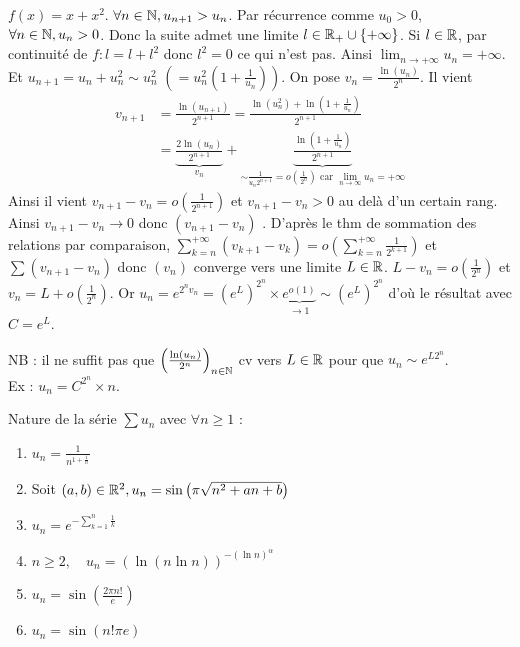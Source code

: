 \begin{solution}
$f(x) = x + x^2$. $\forall n \in \mathbb N, u_{n+1} > u_n$. Par récurrence comme $u_0 > 0$, $\forall n \in \mathbb N, u_n > 0$.
Donc la suite admet une limite $l \in \mathbb R_+ \cup \{+\infty\}$.
Si $l \in \mathbb R$, par continuité de $f : l = l + l^2$ donc $l^2 = 0$ ce qui n'est pas.
Ainsi $\lim_{n \to +\infty} u_n = +\infty$. Et $u_{n+1} = u_n + u_n^2 \sim u_n^2$ $\left( = u_n^2(1 + \frac{1}{u_n}) \right)$.
On pose $v_n = \frac{\ln(u_n)}{2^n}$.
Il vient
\begin{align*}
v_{n+1} &= \frac{\ln(u_{n+1})}{2^{n+1}} = \frac{\ln(u_n^2) + \ln(1+\frac{1}{u_n})}{2^{n+1}} \\
&= \underbrace{\frac{2\ln(u_n)}{2^{n+1}}}_{v_n} + \underbrace{\frac{\ln\left(1+\frac{1}{u_n}\right)}{2^{n+1}}}_{\sim \frac{1}{u_n 2^{n+1}} = o\left(\frac{1}{2^n}\right) \text{ car } \lim_{n \to \infty} u_n = +\infty}
\end{align*}
Ainsi il vient $v_{n+1} - v_n = o\left(\frac{1}{2^{n+1}}\right)$ et $v_{n+1} - v_n > 0$ au delà d'un certain rang. Ainsi $v_{n+1} - v_n \to 0$ donc $(v_{n+1} - v_n)$ .
D'après le thm de sommation des relations par comparaison, $\sum_{k=n}^{+\infty} (v_{k+1}-v_k) = o\left( \sum_{k=n}^{+\infty} \frac{1}{2^{k+1}} \right)$ et $\sum (v_{n+1}-v_n)$  donc $(v_n)$ converge vers une limite $L \in \mathbb R$.
$L - v_n = o\left(\frac{1}{2^n}\right)$ et $v_n = L + o\left(\frac{1}{2^n}\right)$.
Or $u_n = e^{2^n v_n} = (e^L)^{2^n} \times \underbrace{e^{o(1)}}_{\to 1} \sim (e^L)^{2^n}$ d'où le résultat avec $\boxed{C = e^L}$.

\begin{remarkbox}
NB : il ne suffit pas que $\left(\frac{\ln(u_n)}{2^n}\right)_{n \in \mathbb N}$ cv vers $L \in \mathbb R$ pour que $u_n \sim e^{L 2^n}$. \\
Ex : $u_n = C^{2^n} \times n$.
\end{remarkbox}
\end{solution}


\begin{statementbox}
Nature de la série $\sum u_n$ avec $\forall n \geq 1$ :
\begin{enumerate}[label=\alph*)]
  \item $u_n = \frac{1}{n^{1+\frac{1}{n}}}$
  \item Soit $(a,b) \in \mathbb R^2, u_n = \sin\left(\pi \sqrt{n^2+an+b}\right)$ 
  \setcounter{enumi}{3}
  \item $u_n = e^{- \sum_{k=1}^n \frac{1}{k}}$
  \setcounter{enumi}{5}
  \item $n \geq 2, \quad u_n = (\ln(n \ln n))^{-(\ln n)^\alpha}$
  \item $u_n = \sin\left(\frac{2\pi n!}{e}\right)$ \quad [Rappel : $\frac{1}{e} = \sum_{k=0}^{+\infty} \frac{(-1)^k}{k!}$]
  \item $u_n = \sin(n! \pi e)$
\end{enumerate}
\end{statementbox}

